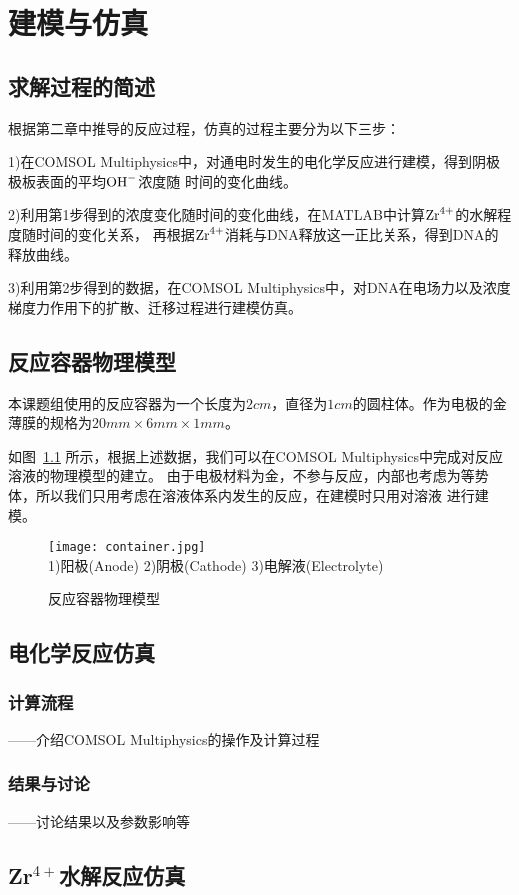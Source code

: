 \chapter{建模与仿真}

\section{求解过程的简述}
根据第二章中推导的反应过程，仿真的过程主要分为以下三步：

1)在COMSOL Multiphysics中，对通电时发生的电化学反应进行建模，得到阴极极板表面的平均$\ce{OH-}$浓度随
时间的变化曲线。

2)利用第1步得到的浓度变化随时间的变化曲线，在MATLAB中计算$\ce{Zr^4+}$的水解程度随时间的变化关系，
再根据$\ce{Zr^4+}$消耗与DNA释放这一正比关系，得到DNA的释放曲线。

3)利用第2步得到的数据，在COMSOL Multiphysics中，对DNA在电场力以及浓度梯度力作用下的扩散、迁移过程进行建模仿真。
\section{反应容器物理模型}
本课题组使用的反应容器为一个长度为$2cm$，直径为$1cm$的圆柱体。作为电极的金薄膜的规格为$20mm×6mm×1mm$。

如图~\ref{fig:container} 所示，根据上述数据，我们可以在COMSOL Multiphysics中完成对反应溶液的物理模型的建立。
由于电极材料为金，不参与反应，内部也考虑为等势体，所以我们只用考虑在溶液体系内发生的反应，在建模时只用对溶液
进行建模。
\begin{figure}[ht]
    \centering
    \texttt{[image: container.jpg]}\\
    1)阳极(Anode) 2)阴极(Cathode) 3)电解液(Electrolyte)
    \caption{反应容器物理模型}
    \label{fig:container}
\end{figure}

\section{电化学反应仿真}
\subsection{计算流程}
——介绍COMSOL Multiphysics的操作及计算过程
\subsection{结果与讨论}
——讨论结果以及参数影响等

\section{Zr$^{4+}$水解反应仿真}
